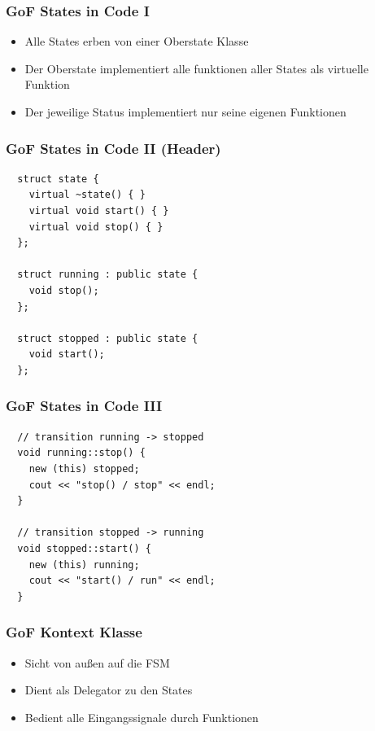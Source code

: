 \documentclass{beamer}
\begin{document}
\begin{frame}
 \frametitle{GoF States in Code I}
 \begin{itemize}
  \item Alle States erben von einer Oberstate Klasse
  \item Der Oberstate implementiert alle funktionen aller States als virtuelle Funktion
  \item Der jeweilige Status implementiert nur seine eigenen Funktionen
 \end{itemize}
\end{frame}

\begin{frame}[fragile]
 \frametitle{GoF States in Code II (Header)}
 \begin{lstlisting}
  struct state {
    virtual ~state() { }
    virtual void start() { }
    virtual void stop() { }
  };

  struct running : public state {
    void stop();
  };

  struct stopped : public state {
    void start();
  };
 \end{lstlisting}
\end{frame}

\begin{frame}[fragile]
 \frametitle{GoF States in Code III}
 \begin{lstlisting}
  // transition running -> stopped
  void running::stop() {
    new (this) stopped;
    cout << "stop() / stop" << endl;
  }

  // transition stopped -> running
  void stopped::start() {
    new (this) running;
    cout << "start() / run" << endl;
  }
 \end{lstlisting}
\end{frame}


\begin{frame}
 \frametitle{GoF Kontext Klasse}
 \begin{itemize}
  \item Sicht von au{\ss}en auf die FSM
  \item Dient als Delegator zu den States
  \item Bedient alle Eingangssignale durch Funktionen
 \end{itemize}
\end{frame}
\end{document}
